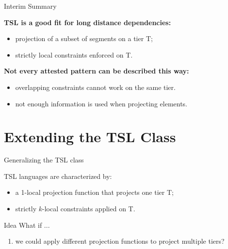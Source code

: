 \documentclass[xcolor={usenames,svgnames,x11names,table}]{beamer}
\begin{document}
 \begin{frame}{Interim Summary}

        \textbf{\textcolor{SkyBlue3!90!black}{TSL is a good fit for long distance dependencies:}}
        
        \begin{itemize}
        		\item projection of a subset of segments on a tier T;
        		\item strictly local constraints enforced on T.
        \end{itemize}
        
        \vspace{0.5cm}
        \textbf{\textcolor{SkyBlue3!90!black}{Not every attested pattern can be described this way:}}
        
        \begin{itemize}
        		\item overlapping constraints cannot work on the same tier.
       		 \item not enough information is used when projecting elements.
        \end{itemize}
        \vspace{0.5cm}
\end{frame}  
            
  
            
\section[Extending the TSL Class]{Extending the TSL Class}    

 \begin{frame}{Generalizing the TSL class}
        
        TSL languages are characterized by:
        
        \begin{itemize}
        \item a \alert{1}-local projection function that projects \alert{one} tier T;
        \item strictly $k$-local constraints applied on T.
        \end{itemize} 
        
        \pause
        
        \begin{block}{Idea}
        What if ...
        \begin{enumerate}
        \item we could apply different projection functions to project \alert{multiple tiers}?
        \end{enumerate}
        
        \end{block}
 
\end{frame}    
\end{document}
